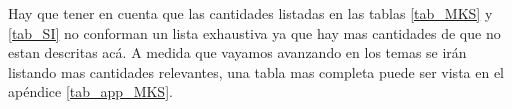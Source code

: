 Hay que tener en cuenta que las cantidades listadas en las tablas \ref{tab_MKS} y \ref{tab_SI} no conforman un lista exhaustiva ya que hay mas cantidades de que no estan descritas ac\'a. A medida que vayamos avanzando en los temas se ir\'an listando mas cantidades relevantes, una tabla mas completa puede ser vista en el ap\'endice \ref{tab_app_MKS}.
